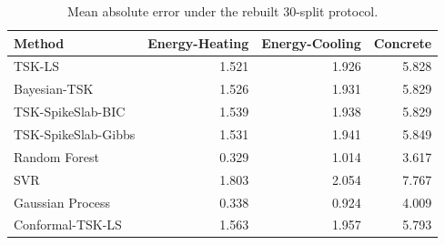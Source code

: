 \begin{table}[htbp]
\centering
\caption{Mean absolute error under the rebuilt 30-split protocol.}
\label{tab:mae}
\scriptsize
\setlength{\tabcolsep}{3pt}
\begin{tabular}{lrrr}
\toprule
Method & Energy-Heating & Energy-Cooling & Concrete \\
\midrule
TSK-LS & 1.521 & 1.926 & 5.828 \\
Bayesian-TSK & 1.526 & 1.931 & 5.829 \\
TSK-SpikeSlab-BIC & 1.539 & 1.938 & 5.829 \\
TSK-SpikeSlab-Gibbs & 1.531 & 1.941 & 5.849 \\
Random Forest & 0.329 & 1.014 & 3.617 \\
SVR & 1.803 & 2.054 & 7.767 \\
Gaussian Process & 0.338 & 0.924 & 4.009 \\
Conformal-TSK-LS & 1.563 & 1.957 & 5.793 \\
\bottomrule
\end{tabular}
\end{table}
